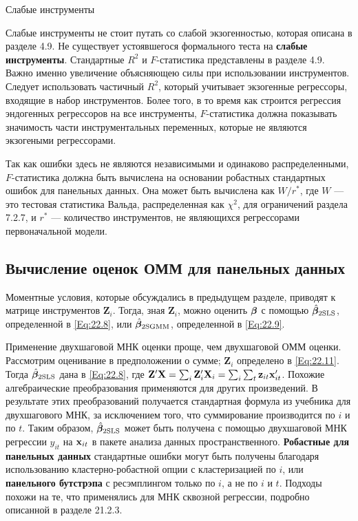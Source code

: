 {\centering  Слабые инструменты}
 

Слабые инструменты не стоит путать со слабой экзогенностью, которая описана в разделе 4.9. Не существует устоявшегося формального теста на \textbf{слабые инструменты}. Стандартные $R^2$ и $F$-статистика представлены в разделе 4.9. Важно именно увеличение объясняющею силы при использовании инструментов. Следует использовать частичный $R^2$, который учитывает экзогенные регрессоры, входящие в набор инструментов. Более того, в то время как строится регрессия эндогенных регрессоров на  все инструменты, $F$-статистика должна показывать значимость части инструментальных переменных, которые не являются экзогеными регрессорами.

Так как ошибки здесь  не являются независимыми и одинаково распределенными, $F$-статистика должна быть вычислена на основании робастных стандартных ошибок для  панельных данных. Она может быть вычислена как $W/r^*$, где $W$  --- это тестовая статистика Вальда, распределенная как $\chi^2$, для ограничений раздела 7.2.7, и $r^*$ --- количество инструментов, не являющихся регрессорами первоначальной модели.

\subsection{Вычисление оценок ОММ для панельных данных}

Моментные условия, которые обсуждались в предыдущем разделе, приводят к матрице инструментов $\mathbf Z_i$. Тогда, зная $\mathbf Z_i$, можно оценить $\bm{\beta}$ с помощью $\hat{\bm{\beta}}_{\mathrm{2SLS}}$, определенной в \ref{Eq:22.8}, или $\hat{\bm{\beta}}_{\mathrm{2SGMM}}$, определенной в \ref{Eq:22.9}.

Применение двухшаговой МНК оценки проще, чем двухшаговой ОММ оценки. Рассмотрим оценивание в предположении о сумме; $\mathbf Z_i$ определено в \ref{Eq:22.11}. Тогда $\hat{\bm{\beta}}_{\mathrm{2SLS}}$ дана в \ref{Eq:22.8}, где $\mathbf Z' \mathbf X =\sum_i \mathbf Z_i' \mathbf X_i=\sum_i \sum_t \mathbf z_{it} \mathbf{x}'_{it}$. Похожие алгебраические преобразования применяются для других произведений. В результате этих преобразований получается стандартная формула из учебника для двухшагового МНК, за исключением того, что суммирование производится по $i$ и по $t$. Таким образом, $\hat{\bm{\beta}}_{\mathrm{2SLS}}$ может быть получена с помощью двухшаговой МНК регрессии $y_{it}$ на $\mathbf{x}_{it}$ в пакете анализа данных пространственного. \textbf{Робастные для панельных данных} стандартные ошибки могут быть получены благодаря использованию кластерно-робастной опции с кластеризацией по $i$, или \textbf{панельного бутстрэпа} с ресэмплингом только по $i$, а не по  $i$ и $t$. Подходы похожи на те, что применялись для МНК сквозной регрессии, подробно описанной в разделе 21.2.3. 

